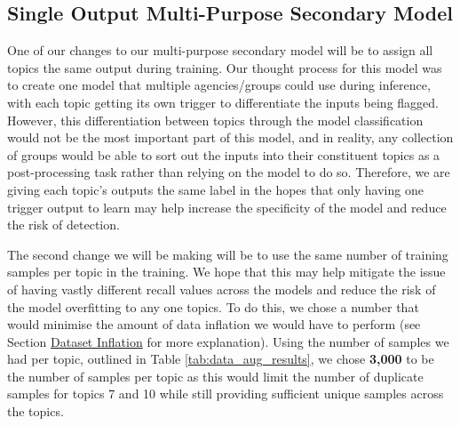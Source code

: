 \subsection{Single Output Multi-Purpose Secondary Model}
\label{comb_sec_v2}

One of our changes to our multi-purpose secondary model will be to assign all topics the same output during training. Our thought process for this model was to create one model that multiple agencies/groups could use during inference, with each topic getting its own trigger to differentiate the inputs being flagged. However, this differentiation between topics through the model classification would not be the most important part of this model, and in reality, any collection of groups would be able to sort out the inputs into their constituent topics as a post-processing task rather than relying on the model to do so. Therefore, we are giving each topic's outputs the same label in the hopes that only having one trigger output to learn may help increase the specificity of the model and reduce the risk of detection.

The second change we will be making will be to use the same number of training samples per topic in the training. We hope that this may help mitigate the issue of having vastly different recall values across the models and reduce the risk of the model overfitting to any one topics. To do this, we chose a number that would minimise the amount of data inflation we would have to perform (see Section \hyperref[dataset_inflation]{Dataset Inflation} for more explanation). Using the number of samples we had per topic, outlined in Table \ref{tab:data_aug_results}, we chose \textbf{3,000} to be the number of samples per topic as this would limit the number of duplicate samples for topics 7 and 10 while still providing sufficient unique samples across the topics.

